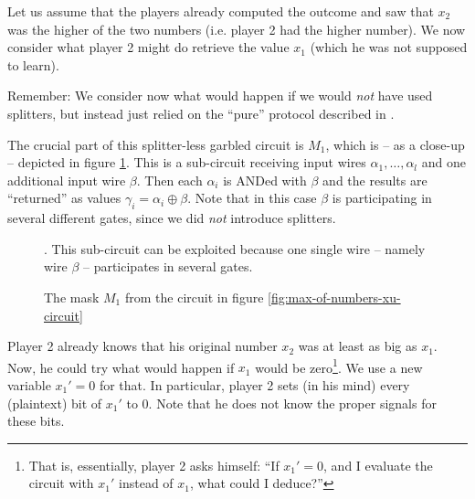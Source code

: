 Let us assume that the players already computed the outcome and saw that $x_2$ was the higher of the two numbers (i.e. player 2 had the higher number). We now consider what player 2 might do retrieve the value $x_1$ (which he was not supposed to learn).

Remember: We consider now what would happen if we would \emph{not} have used splitters, but instead just relied on the ``pure'' protocol described in \cite{Rogaway:1991:RCS:888502}.

The crucial part of this splitter-less garbled circuit is $M_1$, which is -- as a close-up -- depicted in figure \ref{fig:mask-m1}. This is a sub-circuit receiving input wires $\alpha_1,\dots,\alpha_l$ and one additional input wire $\beta$. Then each $\alpha_i$ is ANDed with $\beta$ and the results are ``returned'' as values $\gamma_i = \alpha_i \oplus \beta$. Note that in this case $\beta$ is participating in several different gates, since we did \emph{not} introduce splitters.

\begin{figure}[ht]
  \centering
  \caption{The mask $M_1$ from the circuit in figure \ref{fig:max-of-numbers-xu-circuit}}. This sub-circuit can be exploited because one single wire -- namely wire $\beta$ -- participates in several gates.
  \label{fig:mask-m1}
\end{figure}

Player 2 already knows that his original number $x_2$ was at least as big as $x_1$. Now, he could try what would happen if $x_1$ would be zero\footnote{That is, essentially, player 2 asks himself: ``If $x_1'=0$, and I evaluate the circuit with $x_1'$ instead of $x_1$, what could I deduce?''}. We use a new variable $x_1'=0$ for that. In particular, player 2 sets (in his mind) every (plaintext) bit of $x_1'$ to 0. Note that he does not know the proper signals for these bits.

